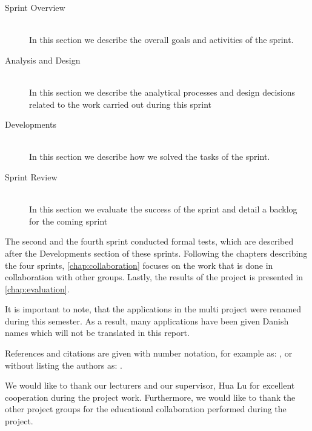 \begin{description}
\item[Sprint Overview] \hfill \\
In this section we describe the overall goals and activities of the sprint.
\item[Analysis and Design] \hfill \\
In this section we describe the analytical processes and design decisions related to the work carried out during this sprint
\item[Developments] \hfill \\
In this section we describe how we solved the tasks of the sprint.
\item[Sprint Review] \hfill \\
In this section we evaluate the success of the sprint and detail a backlog for the coming sprint
\end{description}

The second and the fourth sprint conducted formal tests, which are described after the Developments section of these sprints.
Following the chapters describing the four sprints, \cref{chap:collaboration} focuses on the work that is done in collaboration with other groups.
Lastly, the results of the project is presented in \cref{chap:evaluation}.

It is important to note, that the applications in the multi project were renamed during this semester.
As a result, many applications have been given Danish names which will not be translated in this report.

References and citations are given with number notation, for example as: \citet{launcher2011}, or without listing the authors as: \cite{launcher2011}. 

We would like to thank our lecturers and our supervisor, Hua Lu for excellent cooperation during the project work.
Furthermore, we would like to thank the other project groups for the educational collaboration performed during the project.
